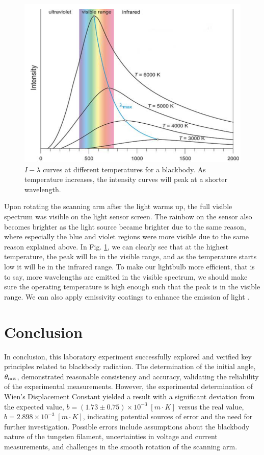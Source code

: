 \documentclass[12pt]{article}
\begin{document}
\begin{figure}[htbp]
\centering
\includegraphics[width=0.5\columnwidth]{figure/curves.png}
\caption{$I-\lambda$ curves at different temperatures \autocite{curves} for a blackbody. As temperature increases, the intensity curves will peak at a shorter wavelength.}
\label{fig:curves}
\end{figure}

Upon rotating the scanning arm after the light warms up, the full visible spectrum was visible on the light sensor screen. The rainbow on the sensor also becomes brighter as the light source became brighter due to the same reason, where especially the blue and violet regions were more visible due to the same reason explained above. In Fig. \ref{fig:curves}, we can clearly see that at the highest temperature, the peak will be in the visible range, and as the temperature starts low it will be in the infrared range. To make our lightbulb more efficient, that is to say, more wavelengths are emitted in the visible spectrum, we should make sure the operating temperature is high enough such that the peak is in the visible range. We can also apply emissivity coatings to enhance the emission of light \autocite{curves}.

\section{Conclusion}
In conclusion, this laboratory experiment successfully explored and verified key principles related to blackbody radiation. The determination of the initial angle, $\theta_{\rm init}$, demonstrated reasonable consistency and accuracy, validating the reliability of the experimental measurements. However, the experimental determination of Wien's Displacement Constant yielded a result with a significant deviation from the expected value, $b=(1.73 \pm 0.75) \times 10^{-3}\;[m\cdot K]$ versus the real value, $b=2.898\times10^{-3}\;[m\cdot K]$, indicating potential sources of error and the need for further investigation. Possible errors include assumptions about the blackbody nature of the tungsten filament, uncertainties in voltage and current measurements, and challenges in the smooth rotation of the scanning arm.
\end{document}
